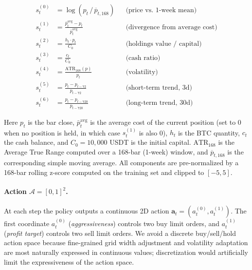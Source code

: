 \documentclass[11pt, a4paper]{article}
\begin{document}
\begin{align}
s_t^{(0)} &= \log\!\left(p_t \,\big/\, \overline{p}_{t, 168}\right) &&
\text{(price vs.\ 1-week mean)} \\
s_t^{(1)} &= \frac{\bar{p}^{\mathrm{avg}}_t - p_t}{\bar{p}^{\mathrm{avg}}_t} &&
\text{(divergence from average cost)} \\
s_t^{(2)} &= \frac{h_t \cdot p_t}{C_0} &&
\text{(holdings value / capital)} \\
s_t^{(3)} &= \frac{c_t}{C_0} &&
\text{(cash ratio)} \\
s_t^{(4)} &= \frac{\mathrm{ATR}_{168}(p)}{p_t} &&
\text{(volatility)} \\
s_t^{(5)} &= \frac{p_t - p_{t-72}}{p_{t-72}} &&
\text{(short-term trend, 3d)} \\
s_t^{(6)} &= \frac{p_t - p_{t-720}}{p_{t-720}} &&
\text{(long-term trend, 30d)}
\end{align}

Here $p_t$ is the bar close, $\bar{p}^{\mathrm{avg}}_t$ is the average cost of
the current position (set to 0 when no position is held, in which case
$s_t^{(1)}$ is also 0), $h_t$ is the BTC quantity, $c_t$ the cash balance, and
$C_0 = 10{,}000$ USDT is the initial capital. $\mathrm{ATR}_{168}$ is the
Average True Range \citep{wilder1978atr} computed over a 168-bar (1-week)
window, and $\overline{p}_{t,168}$ is the corresponding simple moving average.
All components are pre-normalized by a 168-bar rolling z-score computed on the
training set and clipped to $[-5, 5]$.

\paragraph{Action $\mathcal{A} = [0,1]^2$.}
At each step the policy outputs a continuous 2D action $\mathbf{a}_t =
(a_t^{(0)}, a_t^{(1)})$. The first coordinate $a_t^{(0)}$ (\emph{aggressiveness})
controls two buy limit orders, and $a_t^{(1)}$ (\emph{profit target}) controls
two sell limit orders. We avoid a discrete buy/sell/hold action space because
fine-grained grid width adjustment and volatility adaptation are most naturally
expressed in continuous values; discretization would artificially limit the
expressiveness of the action space.
\end{document}
